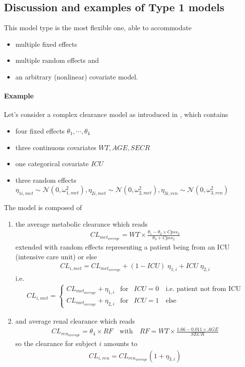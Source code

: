 \subsection{Discussion and examples of Type 1 models}
\label{subsec:paramModelType1}
This model type is the most flexible one, able to accommodate
\begin{itemize}
\item
multiple fixed effects
\item
multiple random effects and
\item
an arbitrary (nonlinear) covariate model.
\end{itemize}

\paragraph{Example}
Let's consider a complex clearance model as introduced in \cite{NONMEM:2006aa}, which contains
\begin{itemize}
\item
four fixed effects $\theta_1, \cdots, \theta_4$
\item
three continuous covariates $WT, AGE, SECR$
\item
one categorical covariate $ICU$
\item
three random effects $\eta_{1i,met}\sim \mathcal{N}(0,\omega_{1,met}^2),\eta_{2i,met}\sim \mathcal{N}(0,\omega_{2,met}^2), \eta_{3i,ren}\sim \mathcal{N}(0,\omega_{3,ren}^2)$
\end{itemize}
The model is composed of
\begin{enumerate}
\item
the average metabolic clearance which reads
\begin{align*}
& CL_{met_{average}} = WT\times \frac{\theta_1 - \theta_2 \times Cpss_2}{\theta_3 + Cpss_2}
\end{align*}
extended with random effects representing a patient being from an ICU (intensive care unit) or else
\begin{align*}
& CL_{i,met} = CL_{met_{average}} + (1 - ICU) \; \eta_{1,i} + ICU \; \eta_{2,i}
\end{align*}
i.e.
\begin{align*}
& CL_{i,met} = \left\{ \begin{array}{lcl}  CL_{met_{average}} + \eta_{1,i}  & \mbox{for} & ICU = 0 \quad \text{i.e. patient not from ICU} \\
CL_{met_{average}} + \eta_{2,i}  & \mbox{for} & ICU = 1 \quad \text{else}
\end{array}\right.
\end{align*}
\item
and average renal clearance which reads
\begin{align*}
& CL_{ren_{average}} = \theta_4 \times RF \quad \text{with}  \quad
RF = WT\times \frac{1.66 - 0.011 \times AGE}{SECR}
\end{align*}
so the clearance for subject $i$ amounts to
\begin{align*}
& CL_{i,ren} = CL_{ren_{average}}(1+ \eta_{3,i})
\end{align*}
\end{enumerate}
